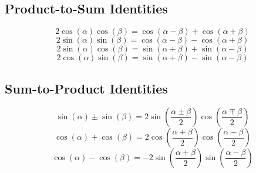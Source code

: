\subsection{Product-to-Sum Identities}\label{subsec:Product-to-Sum Identities}
\begin{equation}\label{eq:Cos-Cos Product-to-Sum Identity}
  2 \cos \left( \alpha \right) \cos \left( \beta \right) = \cos \left( \alpha - \beta \right) + \cos \left( \alpha + \beta \right)
\end{equation}
\begin{equation}\label{eq:Sin-Sin Product-to-Sum Identity}
  2 \sin \left( \alpha \right) \sin \left( \beta \right) = \cos \left( \alpha - \beta \right) - \cos \left( \alpha + \beta \right)
\end{equation}
\begin{equation}\label{eq:Sin-Cos Product-to-Sum Identity}
  2 \sin \left( \alpha \right) \cos \left( \beta \right) = \sin \left( \alpha + \beta \right) + \sin \left( \alpha - \beta \right)
\end{equation}
\begin{equation}\label{eq:Cos-Sin Product-to-Sum Identity}
  2 \cos \left( \alpha \right) \sin \left( \beta \right) = \sin \left( \alpha + \beta \right) - \sin \left( \alpha - \beta \right)
\end{equation}

\subsection{Sum-to-Product Identities}\label{subsec:Sum-to-Product Identities}
\begin{equation}\label{eq:Sin Sum-to-Product Identity}
  \sin \left( \alpha \right) \pm \sin \left( \beta \right) = 2 \sin \left( \frac{ \alpha \pm \beta}{2} \right) \cos \left( \frac{\alpha \mp \beta}{2} \right)
\end{equation}
\begin{equation}\label{eq:Cos+Cos Sum-to-Product Identity}
  \cos \left( \alpha \right) + \cos \left( \beta \right) = 2 \cos \left( \frac{\alpha + \beta}{2} \right) \cos \left( \frac{\alpha - \beta}{2} \right)
\end{equation}
\begin{equation}\label{eq:Cos-Cos Sum-to-Product Identity}
  \cos \left( \alpha \right) - \cos \left( \beta \right) = -2 \sin \left( \frac{\alpha + \beta}{2} \right) \sin \left( \frac{\alpha - \beta}{2} \right)
\end{equation}

